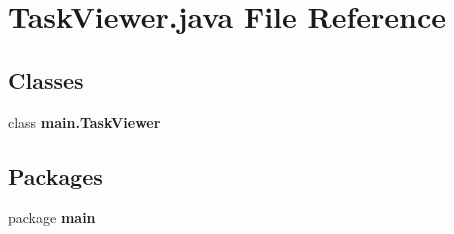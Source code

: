 \section{Task\+Viewer.\+java File Reference}
\label{_task_viewer_8java}
\subsection*{Classes}
\begin{DoxyCompactItemize}
\item 
class \textbf{ main.\+Task\+Viewer}
\end{DoxyCompactItemize}
\subsection*{Packages}
\begin{DoxyCompactItemize}
\item 
package \textbf{ main}
\end{DoxyCompactItemize}
